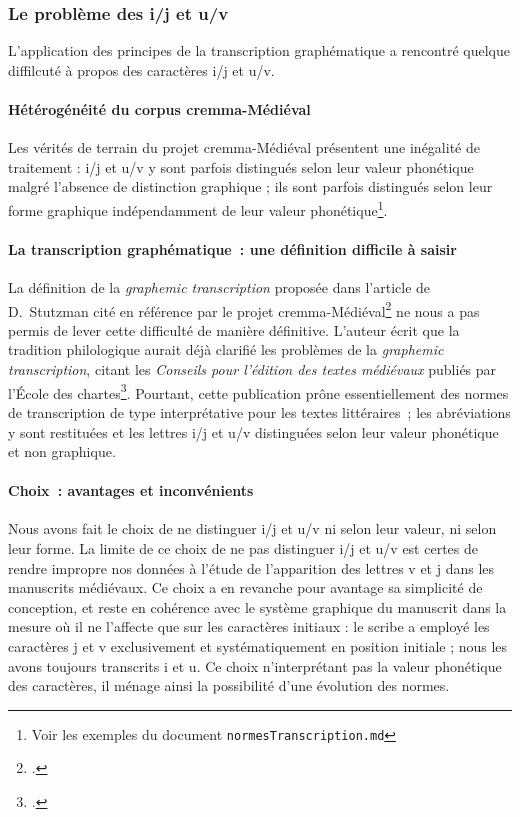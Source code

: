 \documentclass{article}
\begin{document}
\subsubsection{Le problème des i/j et u/v}
L'application des principes de la transcription graphématique a rencontré quelque diffilcuté à propos des caractères i/j et u/v. 
\paragraph{Hétérogénéité du corpus \gls{cremma}-Médiéval}
Les vérités de terrain du projet \gls{cremma}-Médiéval présentent une inégalité de traitement : i/j et u/v y sont parfois distingués selon leur valeur phonétique malgré l'absence de distinction graphique ; ils sont parfois distingués selon leur forme graphique indépendamment de leur valeur phonétique\footnote{Voir les exemples du document \texttt{normesTranscription.md}}.

\paragraph{La transcription graphématique~: une définition difficile à saisir}
La définition de la \textit{graphemic transcription} proposée dans l'article de D.~Stutzman cité en référence par le projet \gls{cremma}-Médiéval\footcite[p.~251]{stutzmannPaleographieStatistiquePour2011} ne nous a pas permis de lever cette difficulté de manière définitive. L'auteur écrit que la tradition philologique aurait déjà clarifié les problèmes de la \textit{graphemic transcription}, citant les \textit{Conseils pour l'édition des textes médiévaux} publiés par l'École des chartes\footcite{ecolenationaledeschartesConseilsPourEdition2001a}. Pourtant, cette publication prône essentiellement des normes de transcription de type interprétative pour les textes littéraires~; les abréviations y sont restituées et les lettres i/j et u/v distinguées selon leur valeur phonétique et non graphique.

\paragraph{Choix~: avantages et inconvénients}
Nous avons fait le choix de ne distinguer i/j et u/v ni selon leur valeur, ni selon leur forme. La limite de ce choix de ne pas distinguer i/j et u/v est certes de rendre impropre nos données à l'étude de l'apparition des lettres v et j dans les manuscrits médiévaux. Ce choix a en revanche pour avantage sa simplicité de conception, et reste en cohérence avec le système graphique du manuscrit dans la mesure où il ne l'affecte que sur les caractères initiaux : le scribe a employé les caractères j et v exclusivement et systématiquement en position initiale ; nous les avons toujours transcrits i et u. Ce choix n'interprétant pas la valeur phonétique des caractères, il ménage ainsi la possibilité d'une évolution des normes.
\end{document}
